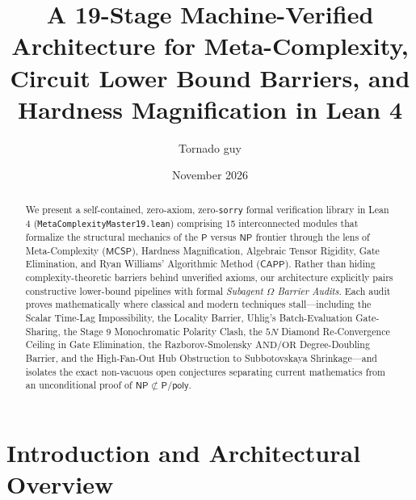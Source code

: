 \documentclass[11pt,a4paper]{article}
\title{\textbf{A 19-Stage Machine-Verified Architecture for Meta-Complexity, Circuit Lower Bound Barriers, and Hardness Magnification in Lean 4}}
\author{Tornado guy}
\date{November 2026}
\theoremstyle{plain}
\theoremstyle{definition}
\theoremstyle{remark}
\newcommand{\lean}[1]{\texttt{\textcolor{slate}{#1}}}
\newcommand{\MCSP}{\mathsf{MCSP}}
\newcommand{\CAPP}{\mathsf{CAPP}}
\newcommand{\NP}{\mathsf{NP}}
\newcommand{\Ppoly}{\mathsf{P/poly}}
\begin{document}
\maketitle

\begin{abstract}
We present a self-contained, zero-axiom, zero-\lean{sorry} formal verification library in Lean 4 (\lean{MetaComplexityMaster19.lean}) comprising 15 interconnected modules that formalize the structural mechanics of the $\mathsf{P}$ versus $\mathsf{NP}$ frontier through the lens of Meta-Complexity ($\MCSP$), Hardness Magnification, Algebraic Tensor Rigidity, Gate Elimination, and Ryan Williams' Algorithmic Method ($\CAPP$). Rather than hiding complexity-theoretic barriers behind unverified axioms, our architecture explicitly pairs constructive lower-bound pipelines with formal \emph{Subagent $\Omega$ Barrier Audits}. Each audit proves mathematically where classical and modern techniques stall---including the Scalar Time-Lag Impossibility, the Locality Barrier, Uhlig's Batch-Evaluation Gate-Sharing, the Stage 9 Monochromatic Polarity Clash, the $5N$ Diamond Re-Convergence Ceiling in Gate Elimination, the Razborov-Smolensky $\text{AND}/\text{OR}$ Degree-Doubling Barrier, and the High-Fan-Out Hub Obstruction to Subbotovskaya Shrinkage---and isolates the exact non-vacuous open conjectures separating current mathematics from an unconditional proof of $\NP \not\subset \Ppoly$.
\end{abstract}

\tableofcontents
\newpage

\section{Introduction and Architectural Overview}
\end{document}
